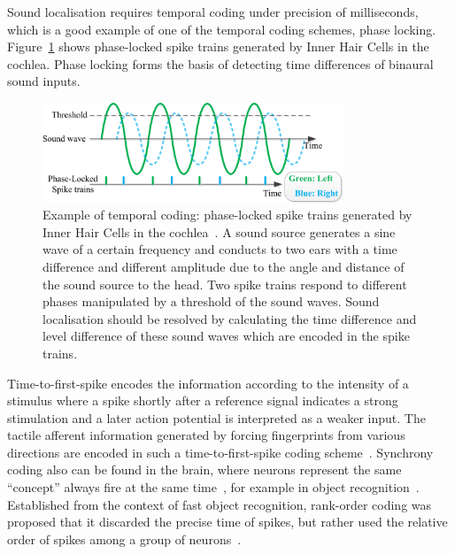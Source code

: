 Sound localisation requires temporal coding under precision of milliseconds, which is a good example of one of the temporal coding schemes, phase locking.
Figure~\ref{Fig:audio_fibre} shows phase-locked spike trains generated by Inner Hair Cells in the cochlea.
Phase locking forms the basis
of detecting time differences of binaural sound inputs.
\begin{figure}[bt]
	\centering
	\includegraphics[width=0.8\textwidth]{pics_snn/phaselocking.png}
	\caption{Example of temporal coding: phase-locked spike trains generated by Inner Hair Cells in the cochlea~\cite{liu2013modeling}.
	A sound source generates a sine wave of a certain frequency and conducts to two ears with a time difference and different amplitude due to the angle and distance of the sound source to the head.
	Two spike trains respond to different phases manipulated by a threshold of the sound waves.
	Sound localisation should be resolved by calculating the time difference and level difference of these sound waves which are encoded in the spike trains.
    }
	\label{Fig:audio_fibre}
\end{figure}

Time-to-first-spike encodes the information according to the intensity of a stimulus where a spike shortly after a reference signal indicates a strong stimulation and a later action potential is interpreted as a weaker input.
The tactile afferent information generated by forcing fingerprints from various directions are encoded in such a time-to-first-spike coding scheme~\cite{johansson2004first}.
Synchrony coding also can be found in the brain, where neurons represent the same ``concept'' always fire at the same time~\cite{von1994correlation}, for example in object recognition~\cite{gray1989stimulus}.
Established from the context of fast object recognition, rank-order coding was proposed that it discarded the precise time of spikes, but rather used the relative order of spikes among a group of neurons~\cite{gautrais1998rate}.


